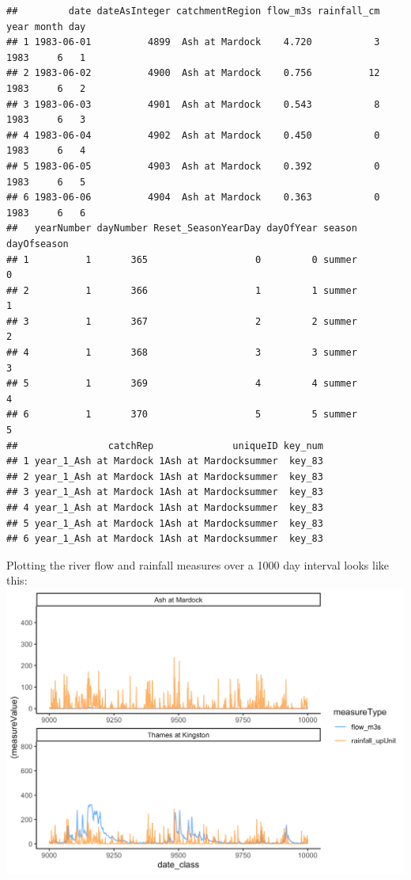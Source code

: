 \documentclass[
]{article}
\begin{document}
\begin{verbatim}
##         date dateAsInteger catchmentRegion flow_m3s rainfall_cm year month day
## 1 1983-06-01          4899  Ash at Mardock    4.720           3 1983     6   1
## 2 1983-06-02          4900  Ash at Mardock    0.756          12 1983     6   2
## 3 1983-06-03          4901  Ash at Mardock    0.543           8 1983     6   3
## 4 1983-06-04          4902  Ash at Mardock    0.450           0 1983     6   4
## 5 1983-06-05          4903  Ash at Mardock    0.392           0 1983     6   5
## 6 1983-06-06          4904  Ash at Mardock    0.363           0 1983     6   6
##   yearNumber dayNumber Reset_SeasonYearDay dayOfYear season dayOfseason
## 1          1       365                   0         0 summer           0
## 2          1       366                   1         1 summer           1
## 3          1       367                   2         2 summer           2
## 4          1       368                   3         3 summer           3
## 5          1       369                   4         4 summer           4
## 6          1       370                   5         5 summer           5
##                catchRep              uniqueID key_num
## 1 year_1_Ash at Mardock 1Ash at Mardocksummer  key_83
## 2 year_1_Ash at Mardock 1Ash at Mardocksummer  key_83
## 3 year_1_Ash at Mardock 1Ash at Mardocksummer  key_83
## 4 year_1_Ash at Mardock 1Ash at Mardocksummer  key_83
## 5 year_1_Ash at Mardock 1Ash at Mardocksummer  key_83
## 6 year_1_Ash at Mardock 1Ash at Mardocksummer  key_83
\end{verbatim}

Plotting the river flow and rainfall measures over a 1000 day interval
looks like this:
\includegraphics[width=1\textwidth,height=\textheight]{man/figures/raw_flow_rain.png}
\end{document}
